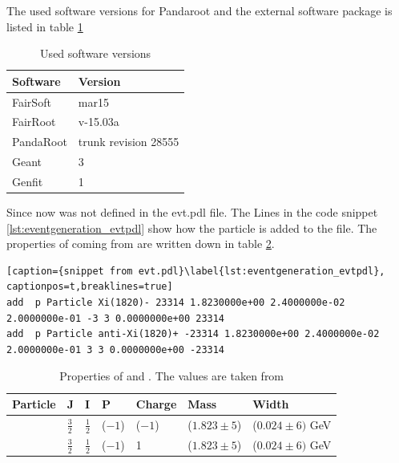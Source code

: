 The used software versions for Pandaroot and the external software package is listed in table \ref{tab:eventgeneration_software} 

\begin{table}[tb]
	\centering
	\caption{Used software versions}
	\label{tab:eventgeneration_software}
	\begin{tabular}{ll}
		\hline
		Software & Version \\
		\hline
		\hline
		FairSoft & mar15\\
		FairRoot & v-15.03a \\
		PandaRoot & trunk revision 28555 \\
		Geant & 3\\
		Genfit & 1\\\hline
			 
	\end{tabular}
\end{table}


Since now \excitedcascade was not defined in the evt.pdl file. 
The Lines in the code snippet \ref{lst:eventgeneration_evtpdl} show how the particle is added to the file.
The properties of \excitedcascade coming from \cite{PDG} are written down in table \ref{tab:eventgeneration_Xivalues}.

\begin{lstlisting}[caption={snippet from evt.pdl}\label{lst:eventgeneration_evtpdl}, captionpos=t,breaklines=true]
add  p Particle Xi(1820)- 23314 1.8230000e+00 2.4000000e-02 2.0000000e-01 -3 3 0.0000000e+00 23314
add  p Particle anti-Xi(1820)+ -23314 1.8230000e+00 2.4000000e-02 2.0000000e-01 3 3 0.0000000e+00 -23314
\end{lstlisting}

\begin{table}[htbp]
	\centering
	\caption{Properties of \excitedcascade and \excitedanticascade. The values are taken from \cite{PDG}}
	\label{tab:eventgeneration_Xivalues}
	\begin{tabular}{lllllll}
		\hline
		Particle & J & I & P & Charge & Mass  & Width \\
		\hline
		\hline
		\excitedcascade & $\frac{3}{2}$ & $\frac{1}{2}$ & ($-1$) & ($-1$) & ($1.823 \pm 5$)\massunit & ($0.024 \pm 6) $ GeV \\
		\excitedanticascade & $\frac{3}{2}$ & $\frac{1}{2}$ & ($-1$) & 1 & ($1.823 \pm 5$)\massunit & ($0.024 \pm 6) $ GeV\\
		\hline
		  
	\end{tabular}
\end{table}

